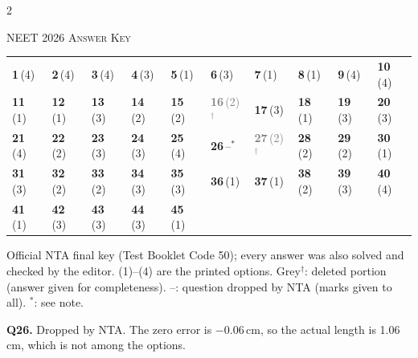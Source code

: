 \begin{multicols}{2}
{}

\end{multicols}
\par{}\vspace{14pt}
\begin{center}{}\par
{\large\color{navy}\scshape NEET 2026 \textperiodcentered{} Answer Key}\end{center}
{\small\setlength{\tabcolsep}{1pt}\renewcommand{\arraystretch}{1.5}
\begin{tabularx}{\linewidth}{@{}*{10}{>{\centering\arraybackslash}X}@{}}\toprule
\textbf{1}\,(4) & \textbf{2}\,(4) & \textbf{3}\,(4) & \textbf{4}\,(3) & \textbf{5}\,(1) & \textbf{6}\,(3) & \textbf{7}\,(1) & \textbf{8}\,(1) & \textbf{9}\,(4) & \textbf{10}\,(4)\\
\textbf{11}\,(1) & \textbf{12}\,(1) & \textbf{13}\,(3) & \textbf{14}\,(2) & \textbf{15}\,(2) & \textcolor{gray}{\textbf{16}\,(2)$^{\dagger}$} & \textbf{17}\,(3) & \textbf{18}\,(1) & \textbf{19}\,(3) & \textbf{20}\,(3)\\
\textbf{21}\,(4) & \textbf{22}\,(2) & \textbf{23}\,(3) & \textbf{24}\,(3) & \textbf{25}\,(4) & \textbf{26}\,--$^{*}$ & \textcolor{gray}{\textbf{27}\,(2)$^{\dagger}$} & \textbf{28}\,(2) & \textbf{29}\,(2) & \textbf{30}\,(1)\\
\textbf{31}\,(3) & \textbf{32}\,(2) & \textbf{33}\,(2) & \textbf{34}\,(3) & \textbf{35}\,(3) & \textbf{36}\,(1) & \textbf{37}\,(1) & \textbf{38}\,(2) & \textbf{39}\,(3) & \textbf{40}\,(4)\\
\textbf{41}\,(1) & \textbf{42}\,(3) & \textbf{43}\,(3) & \textbf{44}\,(3) & \textbf{45}\,(1) &  &  &  &  & \\\bottomrule\end{tabularx}}\par\smallskip
{\footnotesize Official NTA final key (Test Booklet Code 50); every answer was also solved and checked by the editor. (1)--(4) are the printed options. {\color{gray}Grey$^{\dagger}$}: deleted portion (answer given for completeness). --: question dropped by NTA (marks given to all). $^{*}$: see note.\par
\par\smallskip\textbf{Q26.} Dropped by NTA. The zero error is $-0.06$\,cm, so the actual length is 1.06\,cm, which is not among the options.
}\par
